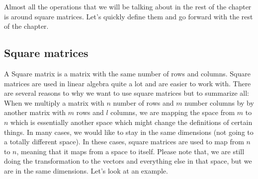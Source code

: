 \documentclass[
]{book}
\theoremstyle{definition}
\theoremstyle{definition}
\theoremstyle{definition}
\theoremstyle{remark}
\begin{document}
Almost all the operations that we will be talking about in the rest of the chapter is around square matrices. Let's quickly define them and go forward with the rest of the chapter.

\hypertarget{square-matrices}{%
\subsection{Square matrices}\label{square-matrices}}

A Square matrix is a matrix with the same number of rows and columns. Square matrices are used in linear algebra quite a lot and are easier to work with. There are several reasons to why we want to use square matrices but to summarize all:
When we multiply a matrix with \(n\) number of rows and \(m\) number columns by by another matrix with \(m\) rows and \(l\) columns, we are mapping the space from \(m\) to \(n\) which is essentially another space which might change the definitions of certain things. In many cases, we would like to stay in the same dimensions (not going to a totally different space). In these cases, square matrices are used to map from \(n\) to \(n\), meaning that it maps from a space to itself. Please note that, we are still doing the transformation to the vectors and everything else in that space, but we are in the same dimensions. Let's look at an example.
\end{document}
